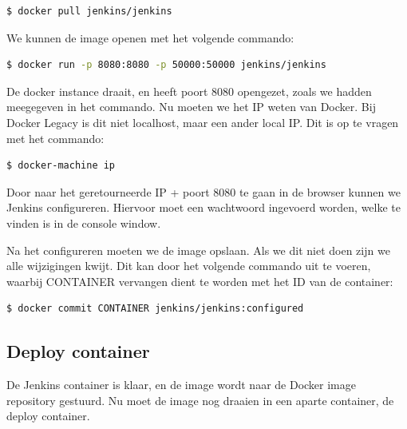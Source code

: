 \documentclass[12pt]{article}
\begin{document}
\begin{lstlisting}[language=Bash]
    $ docker pull jenkins/jenkins
\end{lstlisting}

We kunnen de image openen met het volgende commando:

\begin{lstlisting}[language=Bash]
    $ docker run -p 8080:8080 -p 50000:50000 jenkins/jenkins
\end{lstlisting}

De docker instance draait, en heeft poort 8080 opengezet, zoals we hadden meegegeven in het commando. Nu moeten we het IP weten van Docker. Bij Docker Legacy is dit niet localhost, maar een ander local IP. Dit is op te vragen met het commando:

\begin{lstlisting}[language=Bash]
    $ docker-machine ip
\end{lstlisting}

Door naar het geretourneerde IP + poort 8080 te gaan in de browser kunnen we Jenkins configureren. Hiervoor moet een wachtwoord ingevoerd worden, welke te vinden is in de console window.


Na het configureren moeten we de image opslaan. Als we dit niet doen zijn we alle wijzigingen kwijt. Dit kan door het volgende commando uit te voeren, waarbij CONTAINER vervangen dient te worden met het ID van de container:

\begin{lstlisting}[language=Bash]
    $ docker commit CONTAINER jenkins/jenkins:configured
\end{lstlisting}



\subsection{Deploy container}
De Jenkins container is klaar, en de image wordt naar de Docker image repository gestuurd. Nu moet de image nog draaien in een aparte container, de deploy container.

\end{document}
